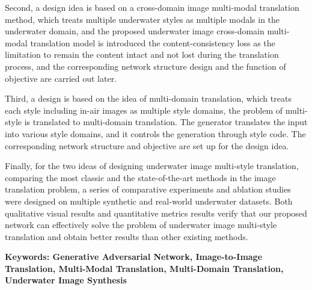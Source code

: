 {Second, a design idea is based on a cross-domain image multi-modal translation method, which treats multiple underwater styles as multiple modals in the underwater domain, and the proposed underwater image cross-domain multi-modal translation model is introduced the content-consistency loss as the limitation to remain the content intact and not lost during the translation process, and the corresponding network structure design and the function of objective are carried out later.

Third, a design is based on the idea of multi-domain translation, which treats each style including in-air images as multiple style domains, the problem of multi-style is translated to multi-domain translation. The generator translates the input into various style domains,  and it controls the generation through style code. The corresponding network structure and objective are set up for the design idea.

Finally, for the two ideas of designing underwater image multi-style translation, comparing the most classic and the state-of-the-art methods in the image translation problem, a series of comparative experiments and ablation studies were designed on multiple synthetic and real-world underwater datasets. Both qualitative visual results and quantitative metrics results verify that our proposed network can effectively solve the problem of underwater image multi-style translation and obtain better results than other existing methods.

}
 
\vskip12bp
{\xiaosi\heiti\noindent 
\textbf{Keywords: Generative Adversarial Network, Image-to-Image Translation, Multi-Modal Translation, Multi-Domain Translation, Underwater Image Synthesis}}
